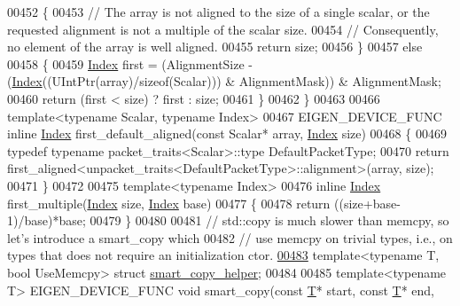 \begin{DoxyCode}
00452   \{
00453     \textcolor{comment}{// The array is not aligned to the size of a single scalar, or the requested alignment is not a
       multiple of the scalar size.}
00454     \textcolor{comment}{// Consequently, no element of the array is well aligned.}
00455     \textcolor{keywordflow}{return} size;
00456   \}
00457   \textcolor{keywordflow}{else}
00458   \{
00459     \hyperlink{namespace_eigen_a62e77e0933482dafde8fe197d9a2cfde}{Index} first = (AlignmentSize - (\hyperlink{namespace_eigen_a62e77e0933482dafde8fe197d9a2cfde}{Index}((UIntPtr(array)/\textcolor{keyword}{sizeof}(Scalar))) & AlignmentMask)) & 
      AlignmentMask;
00460     \textcolor{keywordflow}{return} (first < size) ? first : size;
00461   \}
00462 \}
00463 
00466 \textcolor{keyword}{template}<\textcolor{keyword}{typename} Scalar, \textcolor{keyword}{typename} Index>
00467 EIGEN\_DEVICE\_FUNC \textcolor{keyword}{inline} \hyperlink{namespace_eigen_a62e77e0933482dafde8fe197d9a2cfde}{Index} first\_default\_aligned(\textcolor{keyword}{const} Scalar* array, 
      \hyperlink{namespace_eigen_a62e77e0933482dafde8fe197d9a2cfde}{Index} size)
00468 \{
00469   \textcolor{keyword}{typedef} \textcolor{keyword}{typename} packet\_traits<Scalar>::type DefaultPacketType;
00470   \textcolor{keywordflow}{return} first\_aligned<unpacket\_traits<DefaultPacketType>::alignment>(array, size);
00471 \}
00472 
00475 \textcolor{keyword}{template}<\textcolor{keyword}{typename} Index> 
00476 \textcolor{keyword}{inline} \hyperlink{namespace_eigen_a62e77e0933482dafde8fe197d9a2cfde}{Index} first\_multiple(\hyperlink{namespace_eigen_a62e77e0933482dafde8fe197d9a2cfde}{Index} size, \hyperlink{namespace_eigen_a62e77e0933482dafde8fe197d9a2cfde}{Index} base)
00477 \{
00478   \textcolor{keywordflow}{return} ((size+base-1)/base)*base;
00479 \}
00480 
00481 \textcolor{comment}{// std::copy is much slower than memcpy, so let's introduce a smart\_copy which}
00482 \textcolor{comment}{// use memcpy on trivial types, i.e., on types that does not require an initialization ctor.}
\hyperlink{struct_eigen_1_1internal_1_1smart__copy__helper}{00483} \textcolor{keyword}{template}<\textcolor{keyword}{typename} T, \textcolor{keywordtype}{bool} UseMemcpy> \textcolor{keyword}{struct }\hyperlink{struct_eigen_1_1internal_1_1smart__copy__helper}{smart\_copy\_helper};
00484 
00485 \textcolor{keyword}{template}<\textcolor{keyword}{typename} T> EIGEN\_DEVICE\_FUNC \textcolor{keywordtype}{void} smart\_copy(\textcolor{keyword}{const} \hyperlink{group___sparse_core___module}{T}* start, \textcolor{keyword}{const} \hyperlink{group___sparse_core___module}{T}* end, 

\end{DoxyCode}
